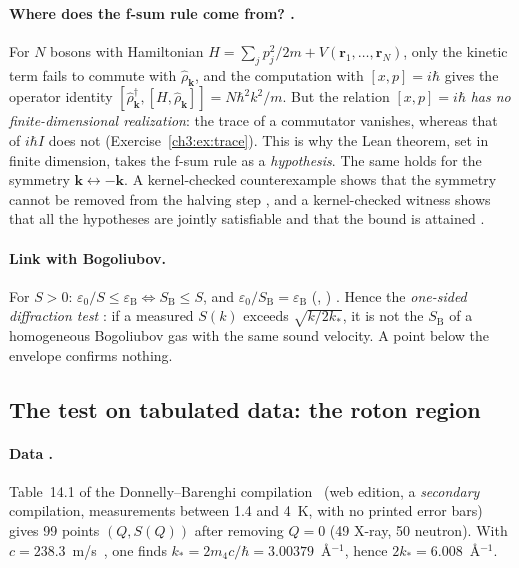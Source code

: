 \paragraph{Where does the f-sum rule come from? \tierC.} For $N$ bosons with Hamiltonian
$H=\sum_jp_j^2/2m+V(\mathbf r_1,\dots,\mathbf r_N)$, only the kinetic term fails to commute with $\hat\rho_{\mathbf k}$,
and the computation with $[x,p]=i\hbar$ gives the operator identity
$[\hat\rho_{\mathbf k}^\dagger,[H,\hat\rho_{\mathbf k}]]=N\hbar^2k^2/m$.
But the relation $[x,p]=i\hbar$ \emph{has no finite-dimensional realization}: the trace of a commutator vanishes,
whereas that of $i\hbar I$ does not (Exercise~\ref{ch3:ex:trace}). This is why the Lean theorem, set in
finite dimension, takes the f-sum rule as a \emph{hypothesis}. The same holds for the symmetry $\mathbf k\leftrightarrow-\mathbf k$.
A kernel-checked counterexample shows that the symmetry cannot be removed from the halving step
\tierAs, and a kernel-checked witness shows that all the hypotheses are jointly satisfiable and that the bound is
attained \tierAs.

\paragraph{Link with Bogoliubov.} For $S>0$: $\varepsilon_0/S\le\varepsilon_{\mathrm B}\iff S_{\mathrm B}\le S$, and
$\varepsilon_0/S_{\mathrm B}=\varepsilon_{\mathrm B}$ (, ) \tierAs.
Hence the \emph{one-sided diffraction test} \tierC: if a measured $S(k)$ exceeds $\sqrt{k/2k_*}$, it is not the
$S_{\mathrm B}$ of a homogeneous Bogoliubov gas with the same sound velocity. A point below the envelope confirms nothing.

\subsection{The test on tabulated data: the roton region}\label{ch3:sec:roton}
\paragraph{Data \tierL.} Table~14.1 of the Donnelly--Barenghi compilation~\cite{ch3-db} (web edition, a
\emph{secondary} compilation, measurements between 1.4 and 4~K, with no printed error bars) gives 99 points $(Q,S(Q))$
after removing $Q=0$ (49 X-ray, 50 neutron). With $c=238.3$~m/s~\cite{ch3-godfrin}, one finds
$k_*=2m_4c/\hbar=3.00379$~\AA$^{-1}$, hence $2k_*=6.008$~\AA$^{-1}$.

